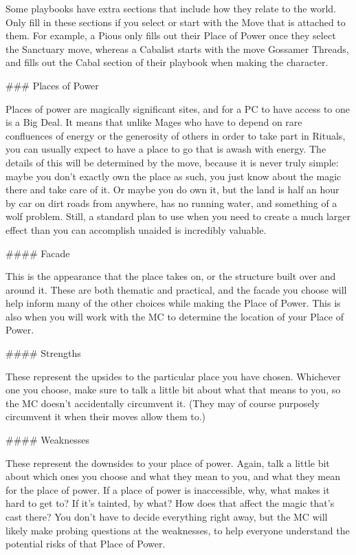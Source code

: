\documentclass[
  oneside,
  statementpaper,
  9pt]{memoir}
\begin{document}
\begin{Player}

Some playbooks have extra sections that include how they relate to the world. Only fill in these sections if you select or start with the Move that is attached to them. For example, a Pious only fills out their Place of Power once they select the Sanctuary move, whereas a Cabalist starts with the move Gossamer Threads, and fills out the Cabal section of their playbook when making the character.

### Places of Power

Places of power are magically significant sites, and for a PC to have access to one is a Big Deal. It means that unlike Mages who have to depend on rare confluences of energy or the generosity of others in order to take part in Rituals, you can usually expect to have a place to go that is awash with energy. The details of this will be determined by the move, because it is never truly simple: maybe you don't exactly own the place as such, you just know about the magic there and take care of it. Or maybe you do own it, but the land is half an hour by car on dirt roads from anywhere, has no running water, and something of a wolf problem. Still, a standard plan to use when you need to create a much larger effect than you can accomplish unaided is incredibly valuable.

#### Facade

This is the appearance that the place takes on, or the structure built over and around it. These are both thematic and practical, and the facade you choose will help inform many of the other choices while making the Place of Power. This is also when you will work with the MC to determine the location of your Place of Power.

#### Strengths

These represent the upsides to the particular place you have chosen. Whichever one you choose, make sure to talk a little bit about what that means to you, so the MC doesn’t accidentally circumvent it. (They may of course purposely circumvent it when their moves allow them to.)

#### Weaknesses

These represent the downsides to your place of power. Again, talk a little bit about which ones you choose and what they mean to you, and what they mean for the place of power. If a place of power is inaccessible, why, what makes it hard to get to? If it’s tainted, by what? How does that affect the magic that’s cast there? You don’t have to decide everything right away, but the MC will likely make probing questions at the weaknesses, to help everyone understand the potential risks of that Place of Power.


\end{Player}
\end{document}
